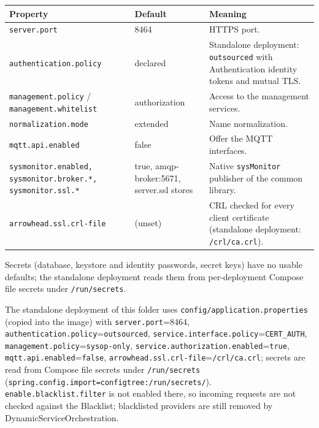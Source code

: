 \documentclass[a4paper]{arrowhead}
\begin{document}
\noindent\begin{longtable}{| p{5.4cm} | p{3.4cm} | p{6.4cm} |} \hline
\rowcolor{gray!33} Property & Default & Meaning \\ \hline \endhead
\texttt{server.\allowbreak{}port} & 8464 & HTTPS port. \\ \hline
\texttt{authentication.\allowbreak{}policy} & declared & Standalone deployment: \texttt{outsourced} with Authentication identity tokens and mutual TLS. \\ \hline
\texttt{management.\allowbreak{}policy} / \texttt{management.\allowbreak{}whitelist} & authorization & Access to the management services. \\ \hline
\texttt{normalization.\allowbreak{}mode} & extended & Name normalization. \\ \hline
\texttt{mqtt.\allowbreak{}api.\allowbreak{}enabled} & false & Offer the MQTT interfaces. \\ \hline
\texttt{sysmonitor.\allowbreak{}enabled,\allowbreak{} sysmonitor.\allowbreak{}broker.\allowbreak{}*,\allowbreak{} sysmonitor.\allowbreak{}ssl.\allowbreak{}*} & true, amqp-broker:5671, server.ssl stores & Native \texttt{sysMonitor} publisher of the common library. \\ \hline
\texttt{arrowhead.\allowbreak{}ssl.\allowbreak{}crl-\allowbreak{}file} & (unset) & CRL checked for every client certificate (standalone deployment: \texttt{/\allowbreak{}crl/\allowbreak{}ca.\allowbreak{}crl}). \\ \hline
\end{longtable}

Secrets (database, keystore and identity passwords, secret keys) have no usable defaults; the standalone deployment reads them from per-deployment Compose file secrets under \texttt{/\allowbreak{}run/\allowbreak{}secrets}.

The standalone deployment of this folder uses \texttt{config/\allowbreak{}application.\allowbreak{}properties} (copied into the image) with \texttt{server.\allowbreak{}port}=8464, \texttt{authentication.\allowbreak{}policy}=\texttt{outsourced}, \texttt{service.\allowbreak{}interface.\allowbreak{}policy}=\texttt{CERT\_AUTH}, \texttt{management.\allowbreak{}policy}=\texttt{sysop-\allowbreak{}only}, \texttt{service.\allowbreak{}authorization.\allowbreak{}enabled}=\texttt{true}, \texttt{mqtt.\allowbreak{}api.\allowbreak{}enabled}=\texttt{false}, \texttt{arrowhead.\allowbreak{}ssl.\allowbreak{}crl-\allowbreak{}file}=\texttt{/\allowbreak{}crl/\allowbreak{}ca.\allowbreak{}crl}; secrets are read from Compose file secrets under \texttt{/\allowbreak{}run/\allowbreak{}secrets} (\texttt{spring.\allowbreak{}config.\allowbreak{}import=\allowbreak{}configtree:\allowbreak{}/\allowbreak{}run/\allowbreak{}secrets/}). \texttt{enable.\allowbreak{}blacklist.\allowbreak{}filter} is not enabled there, so incoming requests are not checked against the Blacklist; blacklisted providers are still removed by Dynamic\allowbreak{}Service\allowbreak{}Orchestration.
\end{document}
